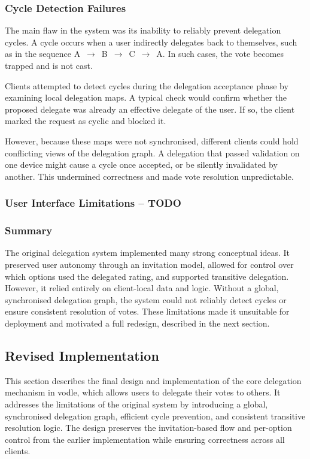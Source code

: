 \subsubsection*{Cycle Detection Failures}

The main flaw in the system was its inability to reliably prevent delegation cycles. A cycle occurs when a user indirectly delegates back to themselves, such as in the sequence A~$\rightarrow$~B~$\rightarrow$~C~$\rightarrow$~A. In such cases, the vote becomes trapped and is not cast.

Clients attempted to detect cycles during the delegation acceptance phase by examining local delegation maps. A typical check would confirm whether the proposed delegate was already an effective delegate of the user. If so, the client marked the request as cyclic and blocked it.

However, because these maps were not synchronised, different clients could hold conflicting views of the delegation graph. A delegation that passed validation on one device might cause a cycle once accepted, or be silently invalidated by another. This undermined correctness and made vote resolution unpredictable.

\subsubsection*{User Interface Limitations -- TODO}

\subsubsection*{Summary}

The original delegation system implemented many strong conceptual ideas. It preserved user autonomy through an invitation model, allowed for control over which options used the delegated rating, and supported transitive delegation. However, it relied entirely on client-local data and logic. Without a global, synchronised delegation graph, the system could not reliably detect cycles or ensure consistent resolution of votes. These limitations made it unsuitable for deployment and motivated a full redesign, described in the next section.

\subsection{Revised Implementation}
This section describes the final design and implementation of the core delegation mechanism in vodle, which allows users to delegate their votes to others. It addresses the limitations of the original system by introducing a global, synchronised delegation graph, efficient cycle prevention, and consistent transitive resolution logic. The design preserves the invitation-based flow and per-option control from the earlier implementation while ensuring correctness across all clients.

